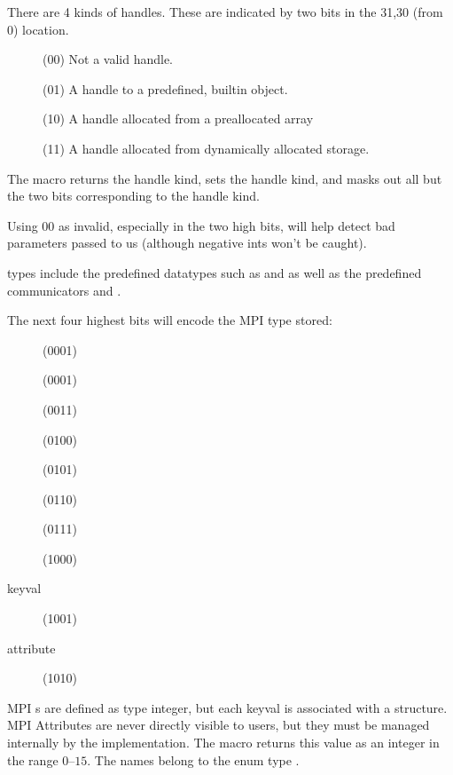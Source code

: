 \documentclass{article}
\begin{document}
There are 4 kinds of handles.  These are indicated by two bits in the
31,30 (from 0) location.
\begin{description}
\item[] (00) Not a valid handle.
\item[] (01) A handle to a predefined,
builtin object. 
\item[] (10) A handle allocated from a
preallocated array 
\item[] (11) A handle allocated from dynamically
allocated storage.
\end{description}
The macro  returns the handle kind,
 sets the handle kind, and
 masks out all but the two bits
corresponding to the handle kind.


Using $00$ as invalid, especially in the two high bits, will help detect
bad parameters passed to us (although negative ints won't be caught).

 types include the predefined datatypes such as
 and  as well as the predefined communicators
 and .

The next four highest bits will encode the MPI type stored:
\begin{description}
\item[]     (0001) 
\item[]    (0001) 
\item[] (0011) 
\item[]     (0100) 
\item[](0101) 
\item[]       (0110) 
\item[]     (0111) 
\item[]      (1000) 
\item[keyval]              (1001) 
\item[attribute]           (1010) 
\end{description}
MPI s are defined as type integer, but each keyval is associated
with a structure.  MPI Attributes are never directly visible to users,
but they must be managed internally by the implementation.
The macro  returns this value as an integer in
the range $0$--$15$.  The names belong to the enum type
. 
\end{document}
